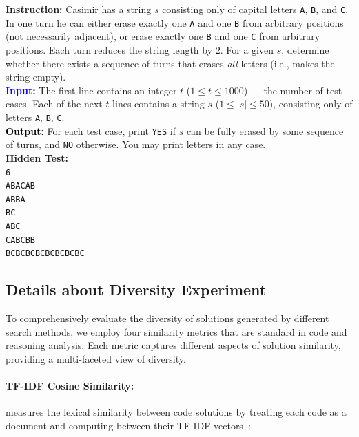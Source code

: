 \documentclass{article} %
\theoremstyle{definition}
\theoremstyle{remark}
\begin{document}
\begin{tcolorbox}[colback=bg,
title=\textbf{Question and Hidden Test in CodeContest}]
\begin{flushleft}
\textcolor{softblue}{\textbf{Instruction:}}
Casimir has a string $s$ consisting only of capital letters \texttt{A}, \texttt{B}, and \texttt{C}. In one turn he can either erase exactly one \texttt{A} and one \texttt{B} from arbitrary positions (not necessarily adjacent), or erase exactly one \texttt{B} and one \texttt{C} from arbitrary positions. Each turn reduces the string length by $2$. For a given $s$, determine whether there exists a sequence of turns that erases \emph{all} letters (i.e., makes the string empty).\\[4pt]

\textcolor{blue}{\textbf{Input:}} The first line contains an integer $t$ ($1 \le t \le 1000$) — the number of test cases. Each of the next $t$ lines contains a string $s$ ($1 \le |s| \le 50$), consisting only of letters \texttt{A}, \texttt{B}, \texttt{C}.\\[2pt]

\textcolor{Black}{\textbf{Output:}} For each test case, print \texttt{YES} if $s$ can be fully erased by some sequence of turns, and \texttt{NO} otherwise. You may print letters in any case.\\[6pt]

\textbf{Hidden Test:}\\
\texttt{6}\\
\texttt{ABACAB}\\
\texttt{ABBA}\\
\texttt{BC}\\
\texttt{ABC}\\
\texttt{CABCBB}\\
\texttt{BCBCBCBCBCBCBCBC}\\[2pt]
\end{flushleft}
\end{tcolorbox}


\subsection{Details about Diversity Experiment}
To comprehensively evaluate the diversity of solutions generated by different search methods, we employ four similarity metrics that are standard in code and reasoning analysis. Each metric captures different aspects of solution similarity, providing a multi-faceted view of diversity.

\paragraph{TF-IDF Cosine Similarity:} 
measures the lexical similarity between code solutions by treating each code as a document and computing between their TF-IDF vectors~\citep{ramos2003using}:
\end{document}
